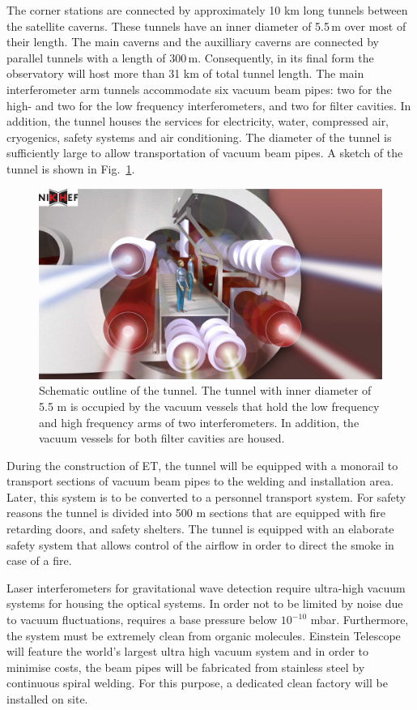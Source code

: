 The corner stations are connected by approximately 10 km long tunnels between the satellite caverns. These tunnels have an inner diameter of 5.5\,m over most of their length. The main caverns and the auxilliary caverns are connected by parallel tunnels with a length of 300\,m. Consequently, in its final form the observatory will host more than 31 km of total tunnel length. The main interferometer arm tunnels accommodate six vacuum beam pipes: two for the high- and two for the low frequency interferometers, and two for filter cavities. In addition, the tunnel houses the services for electricity, water, compressed air, cryogenics, safety systems and air conditioning. The diameter of the tunnel is sufficiently large to allow transportation of vacuum beam pipes. A sketch of the tunnel is shown in Fig.~\ref{fig:infra5}.
\begin{figure}[htbp!]
	\centering
	\includegraphics[width=17cm]{./Sec_SiteInfra/Figures/Tunnels1.pdf}
	\caption{Schematic outline of the tunnel. The tunnel with inner diameter of 5.5 m is occupied by the vacuum vessels that hold the low frequency and high frequency arms of two interferometers. In addition, the vacuum vessels for both filter cavities are housed.}
	\label{fig:infra5}
\end{figure}
During the construction of ET, the tunnel will be equipped with a monorail to transport sections of vacuum beam pipes to the welding and installation area. Later, this system is to be converted to a personnel transport system. For safety reasons the tunnel is divided into 500 m sections that are equipped with fire retarding doors, and safety shelters. The tunnel is equipped with an elaborate safety system that allows control of the airflow in order to direct the smoke in case of a fire.

Laser interferometers for gravitational wave detection require ultra-high vacuum systems for housing the optical systems. In order not to be limited by noise due to vacuum fluctuations, requires a base pressure below $10^{-10}$ mbar. Furthermore, the system must be extremely clean from organic molecules. Einstein Telescope will feature the world's largest ultra high vacuum system and in order to minimise costs, the beam pipes will be fabricated from stainless steel by continuous spiral welding. For this purpose, a dedicated clean factory will be installed on site.


